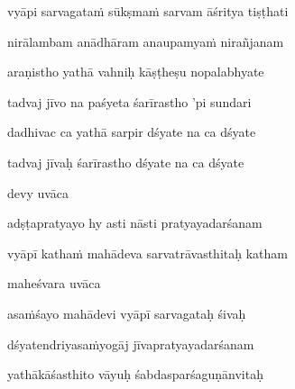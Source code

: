 vyāpi sarvagata\.m sūkṣma\.m sarvam āśritya tiṣṭhati\thinspace{\dandab} \dontdisplaylinenum

nirālambam anādhāram anaupamya\.m nirañjanam \veg\dontdisplaylinenum

araṇistho yathā vahniḥ kāṣṭheṣu nopalabhyate\thinspace{\dandab} \dontdisplaylinenum

tadvaj jīvo na paśyeta śarīrastho 'pi sundari \veg\dontdisplaylinenum

dadhivac ca yathā sarpir dśyate na ca dśyate\thinspace{\dandab} \dontdisplaylinenum

tadvaj jīvaḥ śarīrastho dśyate na ca dśyate \veg\dontdisplaylinenum

devy uvāca~{\dandab}\dontdisplaylinenum 

adṣṭapratyayo hy asti nāsti pratyayadarśanam\thinspace{\danda} \dontdisplaylinenum

vyāpī katha\.m mahādeva sarvatrāvasthitaḥ katham \veg\dontdisplaylinenum

maheśvara uvāca~{\dandab}\dontdisplaylinenum 

asa\.mśayo mahādevi vyāpī sarvagataḥ śivaḥ\thinspace{\danda} \dontdisplaylinenum

dśyatendriyasa\.myogāj jīvapratyayadarśanam \veg\dontdisplaylinenum

yathākāśasthito vāyuḥ śabdasparśaguṇānvitaḥ\thinspace{\dandab} \dontdisplaylinenum

